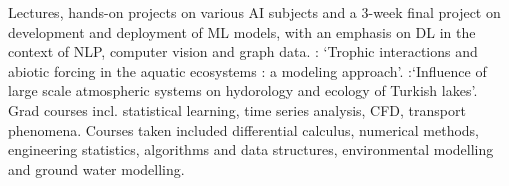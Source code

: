\documentclass[
	a4paper,
]{fortysecondscv}
\begin{document}
\begin{cvtable}[1.0]
		{Lectures, hands-on projects on various AI subjects and a 3-week final project on development and deployment of ML models, with an emphasis on DL in the context of NLP, computer vision and graph data.}
		{\href{https://kops.uni-konstanz.de/handle/123456789/16454}{\color{pblue}{Thesis}}: `Trophic interactions and abiotic forcing in the aquatic ecosystems : a modeling approach'.}
		{\href{https://open.metu.edu.tr/handle/11511/17512}{\color{pblue}{Thesis}}:`Influence of large scale atmospheric systems on hydorology and ecology of Turkish lakes'. Grad courses incl. statistical learning, time series analysis, CFD, transport phenomena.}
		{Courses taken included differential calculus, numerical methods, engineering statistics, algorithms and data structures, environmental modelling and ground water modelling.}
\end{cvtable}
\end{document}
